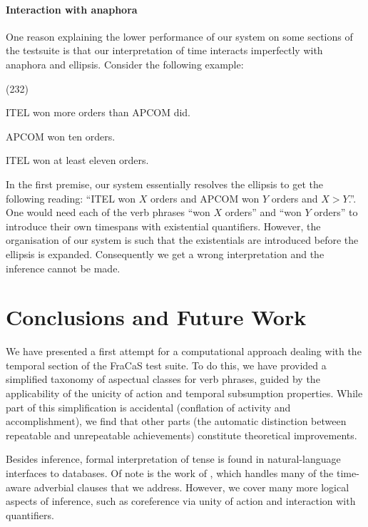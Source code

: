 \documentclass[11pt,a4paper]{article}
\newcommand\hyp{\item[H]}
\newcommand\fracasex[2]{\begin{lingex}\item[(#1)] \begin{subex} #2 \end{subex} \end{lingex} }
\begin{document}
\paragraph{Interaction with anaphora}
\label{sec:interaction-with-anaphora}
One reason explaining the lower performance of our system on some
sections of the testsuite is that our interpretation of time interacts
imperfectly with anaphora and ellipsis. Consider the following example:

\vspace{-1.5ex}
\fracasex{232}
{\item	ITEL won more orders than APCOM did.
\item	APCOM won ten orders.
\hyp 	ITEL won at least eleven orders.
}

In the first premise, our system essentially resolves the ellipsis to
get the following reading: ``ITEL won \(X\) orders and APCOM won \(Y\) orders
and $X > Y$.''. One would need each of the verb phrases ``won \(X\) orders''
and ``won $Y$ orders'' to introduce their own timespans with existential
quantifiers. However, the organisation of our system is such that the
existentials are introduced before the ellipsis is
expanded. Consequently we get a wrong interpretation and the inference
cannot be made.


\section{Conclusions and Future Work}
\label{sec:conclusion}

We have presented a first attempt for a computational approach dealing
with the temporal section of the FraCaS test suite. To do this, we
have provided a simplified taxonomy of aspectual classes for verb
phrases, guided by the applicability of the unicity of action and
temporal subsumption properties. While part of this simplification is
accidental (conflation of activity and accomplishment), we find that
other parts (the automatic distinction between repeatable and
unrepeatable achievements) constitute theoretical improvements.

Besides inference, formal interpretation of tense is found in
natural-language interfaces to databases. Of note is the work of
\citet{androutsopoulos1998time}, which handles many of the time-aware
adverbial clauses that we address. However, we cover many more
 logical aspects of inference, such as coreference via
unity of action and interaction with quantifiers.
\end{document}
